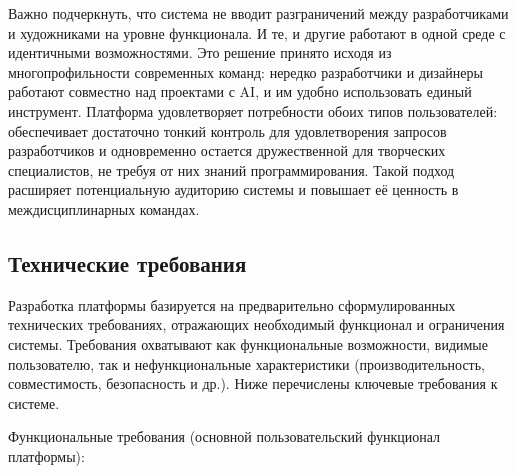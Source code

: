 Важно подчеркнуть, что система не вводит разграничений между разработчиками и художниками на уровне функционала. И те, и другие работают в одной среде с идентичными возможностями. Это решение принято исходя из многопрофильности современных команд: нередко разработчики и дизайнеры работают совместно над проектами с AI, и им удобно использовать единый инструмент. Платформа удовлетворяет потребности обоих типов пользователей: обеспечивает достаточно тонкий контроль для удовлетворения запросов разработчиков и одновременно остается дружественной для творческих специалистов, не требуя от них знаний программирования. Такой подход расширяет потенциальную аудиторию системы и повышает её ценность в междисциплинарных командах.

\subsection{Технические требования}

Разработка платформы базируется на предварительно сформулированных технических требованиях, отражающих необходимый функционал и ограничения системы. Требования охватывают как функциональные возможности, видимые пользователю, так и нефункциональные характеристики (производительность, совместимость, безопасность и др.). Ниже перечислены ключевые требования к системе.

Функциональные требования (основной пользовательский функционал платформы):

